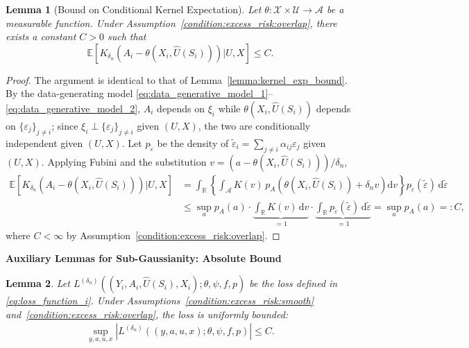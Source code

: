 \documentclass[12pt]{article}
\newtheorem{lemma}{Lemma}%
\newcommand{\E}{\mathbb{E}}
\newcommand{\R}{\mathbb{R}}
\begin{document}
\begin{lemma}[Bound on Conditional Kernel Expectation]\label{lemma:kernel_theta_exp_bound}
Let $\theta:\mathcal{X}\times\mathcal{U}\to\mathcal{A}$ be a measurable function.  Under Assumption~\ref{condition:excess_risk:overlap}, there exists a constant $C>0$ such that
$$\E\!\left[K_{\delta_n}\!\left(A_i - \theta(X_i,\widehat{U}(S_i))\right)\bigg|U,X\right] \leq C.$$
\end{lemma}

\begin{proof}
The argument is identical to that of Lemma~\ref{lemma:kernel_exp_bound}.  By the data-generating model \eqref{eq:data_generative_model_1}--\eqref{eq:data_generative_model_2}, $A_i$ depends on $\xi_i$ while $\theta(X_i,\widehat{U}(S_i))$ depends on $\{\varepsilon_j\}_{j\neq i}$; since $\xi_i\perp\{\varepsilon_j\}_{j\neq i}$ given $(U,X)$, the two are conditionally independent given $(U,X)$.  Let $p_{\tilde\varepsilon}$ be the density of $\tilde\varepsilon_i=\sum_{j\neq i}\alpha_{ij}\varepsilon_j$ given $(U,X)$.  Applying Fubini and the substitution $v=(a-\theta(X_i,\widehat{U}(S_i)))/\delta_n$,
\begin{align*}
\E\!\left[K_{\delta_n}\!\left(A_i-\theta(X_i,\widehat{U}(S_i))\right)\bigg|U,X\right]
&= \int_{\R}\!\left\{\int_{\mathcal{A}}K(v)\,p_A\!\left(\theta(X_i,\widehat{U}(S_i))+\delta_n v\right)\mathrm{d}v\right\}p_{\tilde\varepsilon}(\tilde\varepsilon)\,\mathrm{d}\tilde\varepsilon\\
&\leq \sup_{a}p_A(a)\cdot\underbrace{\int_{\R}K(v)\,\mathrm{d}v}_{=1}\cdot\underbrace{\int_{\R}p_{\tilde\varepsilon}(\tilde\varepsilon)\,\mathrm{d}\tilde\varepsilon}_{=1}
= \sup_a p_A(a) =: C,
\end{align*}
where $C<\infty$ by Assumption~\ref{condition:excess_risk:overlap}.
\end{proof}

\noindent\textbf{Auxiliary Lemmas for Sub-Gaussianity: Absolute Bound}

\begin{lemma}\label{lemma:L_i_bound}
    Let $L^{(\delta_n)}((Y_i,A_i,\widehat U(S_i),X_i);\theta,\psi,f,p)$ be the loss defined in \eqref{eq:loss_function_i}.  Under Assumptions~\ref{condition:excess_risk:smooth} and~\ref{condition:excess_risk:overlap}, the loss is uniformly bounded:
    \begin{align*}
        \sup_{y,a,u,x}\left|L^{(\delta_n)}((y,a,u,x);\theta,\psi,f,p)\right| \leq C.
    \end{align*}
\end{lemma}
\end{document}
